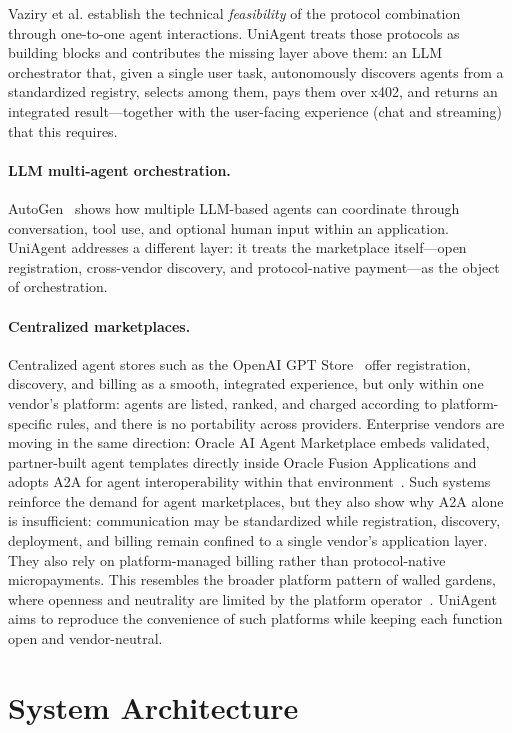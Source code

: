 \documentclass[sigconf]{acmart}
\begin{document}
Vaziry et al. establish the technical \emph{feasibility} of the
protocol combination through one-to-one agent interactions. UniAgent
treats those protocols as building blocks and contributes the missing
layer above them: an LLM orchestrator that, given a single user task,
autonomously discovers agents from a standardized registry, selects
among them, pays them over x402, and returns an integrated
result---together with the user-facing experience (chat and streaming)
that this requires.

\paragraph{LLM multi-agent orchestration.}
AutoGen~\cite{wu2023autogen} shows how multiple LLM-based agents can
coordinate through conversation, tool use, and optional human input
within an application. UniAgent addresses a different layer: it treats
the marketplace itself---open registration, cross-vendor discovery, and
protocol-native payment---as the object of orchestration.

\paragraph{Centralized marketplaces.}
Centralized agent stores such as the OpenAI GPT Store~\cite{gptstore}
offer registration, discovery, and billing as a smooth, integrated
experience, but only within one vendor's platform: agents are listed,
ranked, and charged according to platform-specific rules, and there is
no portability across providers. Enterprise vendors are moving in the
same direction: Oracle AI Agent Marketplace embeds validated,
partner-built agent templates directly inside Oracle Fusion
Applications and adopts A2A for agent interoperability within that
environment~\cite{oracleAgentMarketplace2025}. Such systems reinforce
the demand for agent marketplaces, but they also show why A2A alone is
insufficient: communication may be standardized while registration,
discovery, deployment, and billing remain confined to a single vendor's
application layer. They also rely on platform-managed billing rather
than protocol-native micropayments. This resembles the broader platform
pattern of walled gardens, where openness and neutrality are limited by
the platform
operator~\cite{frieden2016platforms}. UniAgent aims to reproduce the
convenience of such platforms while keeping each function open and
vendor-neutral.

\section{System Architecture}
\label{sec:architecture}
\end{document}
